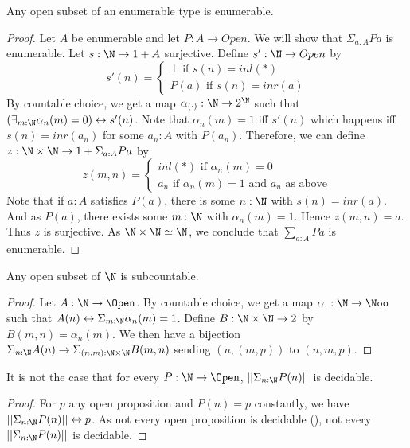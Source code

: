 \begin{lemma}\label{OpenSubsetEnumerableAreEnumerable}
  Any open subset of an enumerable type is enumerable. 
\end{lemma}
\begin{proof}
  Let $A$ be enumerable and let $P:A \to Open$.
  We will show that $\Sigma_{a:A} P a$ is enumerable. 
  Let $s:\N \to 1 + A$ surjective. 
  Define $s':\N \to Open$ by 
  $$
  s'(n) = 
  \begin{cases}
    \bot \text { if } s(n) = inl(*)\\
    P(a) \text { if } s(n) = inr(a)
  \end{cases}
  $$ 
  By countable choice, we get a map 
  $\alpha_{(\cdot)}: \N \to 2^\N$  such that 
  $(\exists_{m:\N} \alpha_n(m) = 0) \leftrightarrow s'(n)$. 
  Note that $\alpha_n(m) = 1$ iff 
  $s'(n)$ which happens iff $s(n) = inr(a_n)$ for some $a_n:A$ with $P(a_n)$. 
  Therefore, we can define 
  $z:\N \times \N \to 1 + \Sigma_{a:A} P a$ by 
  \begin{equation}
    z(m,n) = 
    \begin{cases}
      inl(*) \text{ if } \alpha_{n}(m) = 0 \\
      a_n  \text{ if } \alpha_{n}(m) = 1 \text{ and $a_n$ as above}
    \end{cases}
  \end{equation}
  Note that if $a:A$ satisfies $P(a)$, there is some $n:\N$ with $s(n) = inr(a)$. 
  And as $P(a)$, there exists some $m:\N$ with $\alpha_n(m) = 1$. 
  Hence $z(m,n) = a$. 
  Thus $z$ is surjective. 
  As $\N \times \N \simeq \N$, we conclude that 
  $\sum_{a:A} P a$ is enumerable. 
\end{proof}

\begin{lemma}
  Any open subset of $\N$ is subcountable. 
\end{lemma}
\begin{proof}
  Let $A:\N \to \Open$. 
  By countable choice, we get a map $\alpha_{\cdot}: \N \to \Noo$ such that 
  $A(n) \leftrightarrow \Sigma_{m:\N} \alpha_n (m) = 1$. 
  Define $B:\N \times \N \to 2$ by $B(m,n) = \alpha_n(m)$. 
  We then have a bijection $\Sigma_{n:\N} A(n) \to \Sigma_{(n,m) : \N \times \N} B(m,n)$ sending 
  $(n,(m,p))$ to $(n,m,p)$.
\end{proof}



\begin{lemma}\label{OpenSubsetOfNNotDecidable}
  It is not the case that for every $P:\N \to \Open$, 
  $||\Sigma_{n:\N} P(n)||$ is decidable.
\end{lemma}
\begin{proof}
  For $p$ any open proposition and $P(n) = p$ constantly, we have 
  $||\Sigma_{n:\N} P(n)||\leftrightarrow p$. 
  As not every open proposition is decidable (), 
  not every $||\Sigma_{n:\N} P(n)||$ is decidable. 
\end{proof}

